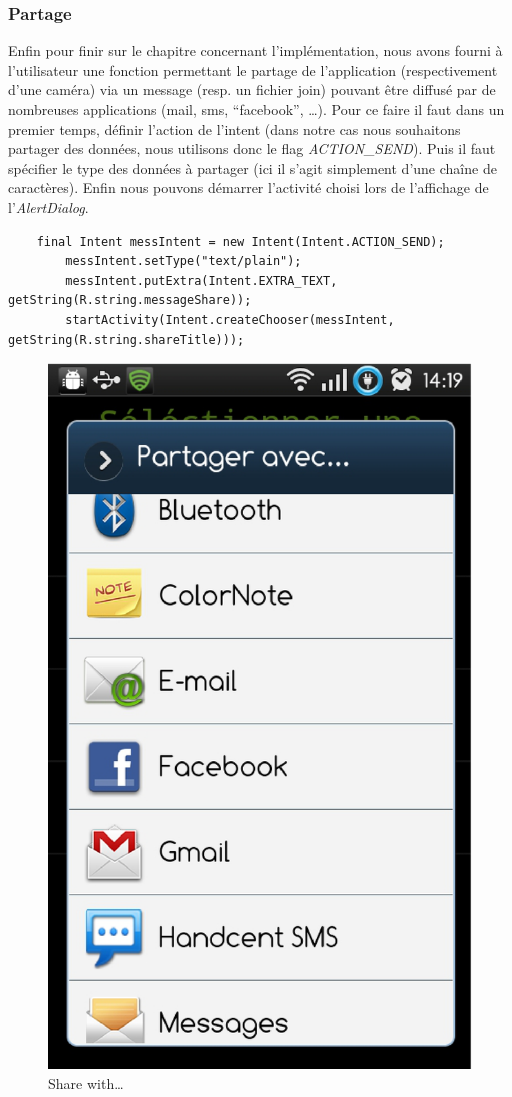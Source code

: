 \subsubsection{Partage}
Enfin pour finir sur le chapitre concernant l'implémentation, nous avons fourni
à l'utilisateur une fonction permettant le partage de l'application
(respectivement d'une caméra) via un message (resp. un fichier join) pouvant
être diffusé par de nombreuses applications (mail, sms, ``facebook'', \ldots).
Pour ce faire il faut dans un premier temps, définir l'action de
l'intent (dans notre cas nous souhaitons partager des données, nous utilisons donc le flag
\textit{ACTION\_SEND}). Puis il faut spécifier le type des données à partager
(ici il s'agit simplement d'une chaîne de caractères).
Enfin nous pouvons démarrer l'activité choisi lors de l'affichage de
l'\textit{AlertDialog}.
\begin{lstlisting}
    final Intent messIntent = new Intent(Intent.ACTION_SEND);
	    messIntent.setType("text/plain");
	    messIntent.putExtra(Intent.EXTRA_TEXT, getString(R.string.messageShare));
	    startActivity(Intent.createChooser(messIntent, getString(R.string.shareTitle)));
\end{lstlisting}
\begin{figure}[H]
\centering
  \label{partage}
   \includegraphics[scale=0.4]{Images/partage.eps}
  \caption{Share with\ldots}
\end{figure} 


